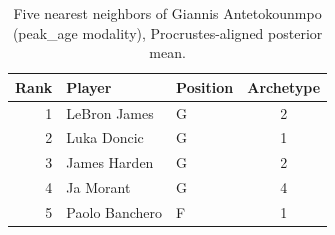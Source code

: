 \begin{table}[htbp]
  \centering\small
  \begin{tabular}{rllc}
    \toprule
    Rank & Player & Position & Archetype \\
    \midrule
    1 & LeBron James & G & 2 \\
    2 & Luka Doncic & G & 1 \\
    3 & James Harden & G & 2 \\
    4 & Ja Morant & G & 4 \\
    5 & Paolo Banchero & F & 1 \\
    \bottomrule
  \end{tabular}
  \caption{Five nearest neighbors of Giannis Antetokounmpo (peak_age modality), Procrustes-aligned posterior mean.}
  \label{tab:Giannis_Antetokounmpo_neighbors_peak_age}
\end{table}

